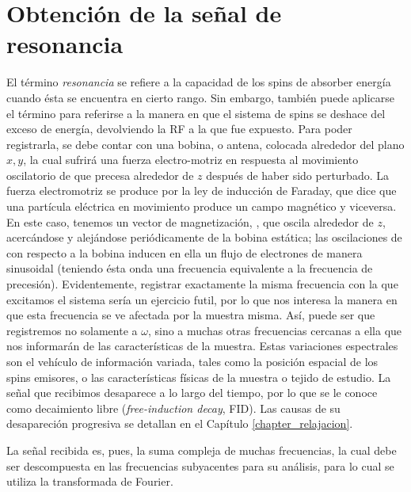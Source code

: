 \section{Obtención de la señal de resonancia}
\label{section:mrsignal}
El término \emph{resonancia} se refiere a la capacidad de los spins de absorber energía cuando ésta se encuentra en cierto rango. Sin embargo, también puede aplicarse el término para referirse a la manera en que el sistema de spins se deshace del exceso de energía, devolviendo la RF a la que fue expuesto. Para poder registrarla, se debe contar con una bobina, o antena, colocada alrededor del plano $x,y$, la cual sufrirá una fuerza electro-motriz en respuesta al movimiento oscilatorio de \Mzero que precesa alrededor de $z$ después de haber sido perturbado. La fuerza electromotriz se produce por la ley de inducción de Faraday, que dice que una partícula eléctrica en movimiento produce un campo magnético y viceversa. En este caso, tenemos un vector de magnetización, \Mzero, que oscila alrededor de $z$, acercándose y alejándose periódicamente de la bobina estática; las oscilaciones de \Mzero con respecto a la bobina inducen en ella un flujo de electrones de manera sinusoidal (teniendo ésta onda una frecuencia equivalente a la frecuencia de precesión). Evidentemente, registrar exactamente la misma frecuencia con la que excitamos el sistema sería un ejercicio futil, por lo que nos interesa la manera en que esta frecuencia se ve afectada por la muestra misma. Así, puede ser que registremos no solamente a $\omega$, sino a muchas otras frecuencias cercanas a ella que nos informarán de las características de la muestra. Estas variaciones espectrales son el vehículo de información variada, tales como la posición espacial de los spins emisores, o las características físicas de la muestra o tejido de estudio. La señal que recibimos desaparece a lo largo del tiempo, por lo que se le conoce como decaimiento libre (\textit{free-induction decay}, FID). Las causas de su desapareción progresiva se detallan en el Capítulo \ref{chapter_relajacion}. 

La señal recibida es, pues, la suma compleja de muchas frecuencias, la cual debe ser descompuesta en las frecuencias subyacentes para su análisis, para lo cual se utiliza la transformada de Fourier.



% 
